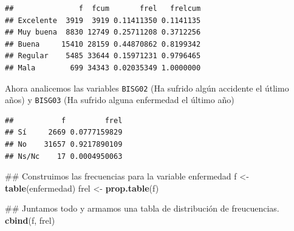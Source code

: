 \documentclass[spanish,]{book}
\newenvironment{Shaded}{\begin{snugshade}}{\end{snugshade}}
\newcommand{\KeywordTok}[1]{\textcolor[rgb]{0.13,0.29,0.53}{\textbf{#1}}}
\newcommand{\DataTypeTok}[1]{\textcolor[rgb]{0.13,0.29,0.53}{#1}}
\newcommand{\StringTok}[1]{\textcolor[rgb]{0.31,0.60,0.02}{#1}}
\newcommand{\OperatorTok}[1]{\textcolor[rgb]{0.81,0.36,0.00}{\textbf{#1}}}
\newcommand{\NormalTok}[1]{#1}
\begin{document}
\begin{verbatim}
##               f  fcum       frel   frelcum
## Excelente  3919  3919 0.11411350 0.1141135
## Muy buena  8830 12749 0.25711208 0.3712256
## Buena     15410 28159 0.44870862 0.8199342
## Regular    5485 33644 0.15971231 0.9796465
## Mala        699 34343 0.02035349 1.0000000
\end{verbatim}

Ahora analicemos las variables \texttt{BISG02} (Ha sufrido algún
accidente el útlimo años) y \texttt{BISG03} (Ha sufrido alguna
enfermedad el último año)

\begin{Shaded}
\end{Shaded}

\begin{verbatim}
##           f         frel
## Sí     2669 0.0777159829
## No    31657 0.9217890109
## Ns/Nc    17 0.0004950063
\end{verbatim}

\begin{Shaded}
\begin{Highlighting}[]
\NormalTok{## Construimos las frecuencias para la variable enfermedad}
\NormalTok{f <-}\StringTok{ }\KeywordTok{table}\NormalTok{(enfermedad)}
\NormalTok{frel <-}\StringTok{ }\KeywordTok{prop.table}\NormalTok{(f)}

\NormalTok{## Juntamos todo y armamos una tabla de distribución de freucuencias.}
\KeywordTok{cbind}\NormalTok{(f, frel)}
\end{Highlighting}
\end{Shaded}
\end{document}
